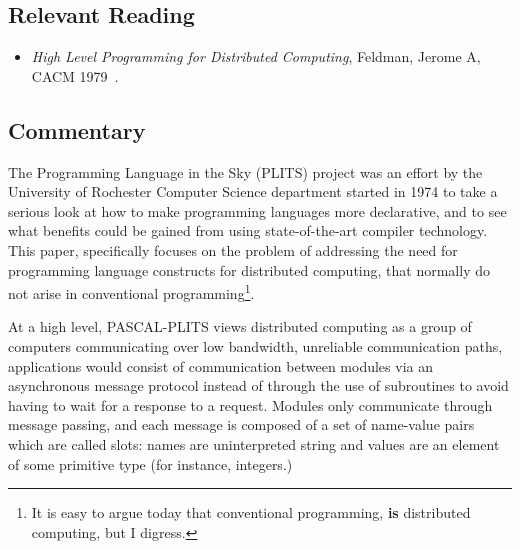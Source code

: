 \subsection{Relevant Reading}

\begin{itemize}
	\item \textit{High Level Programming for Distributed Computing}, Feldman, Jerome A, CACM 1979~\cite{feldman1979high}.
\end{itemize}

\subsection{Commentary}

The Programming Language in the Sky (PLITS) project was an effort by the University of Rochester Computer Science department started in 1974 to take a serious look at how to make programming languages more declarative, and to see what benefits could be gained from using state-of-the-art compiler technology.  This paper, specifically focuses on the problem of addressing the need for programming language constructs for distributed computing, that normally do not arise in conventional programming\footnote{It is easy to argue today that conventional programming, \textbf{is} distributed computing, but I digress.}.

At a high level, PASCAL-PLITS views distributed computing as a group of computers communicating over low bandwidth, unreliable communication paths, applications would consist of communication between modules via an asynchronous message protocol instead of through the use of subroutines to avoid having to wait for a response to a request.  Modules only communicate through message passing, and each message is composed of a set of name-value pairs which are called slots: names are uninterpreted string and values are an element of some primitive type (for instance, integers.)

